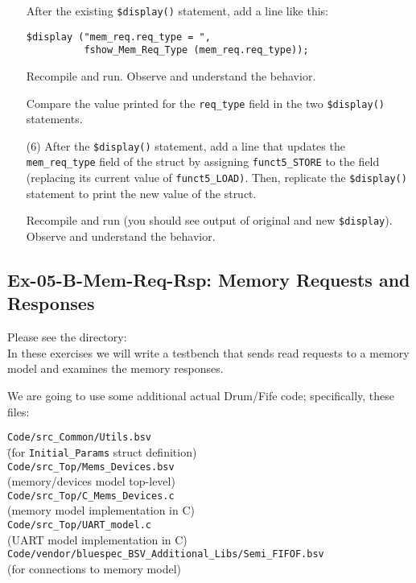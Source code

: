 \begin{itemize}
    After the existing \verb|$display()| statement, add a line like this:

    \hmm \verb|$display ("mem_req.req_type = ",| \\
    \hmm \verb|          fshow_Mem_Req_Type (mem_req.req_type));|

    Recompile and run. Observe and understand the behavior.

    Compare the value printed for the \verb|req_type| field in the two
    \verb|$display()| statements.

\item[(6)] After the \verb|$display()| statement, add a line that
    updates the \verb|mem_req_type| field of the struct by assigning
    \verb|funct5_STORE| to the field (replacing its current value of
    \verb|funct5_LOAD)|. Then, replicate the \verb|$display()|
    statement to print the new value of the struct.

    Recompile and run (you should see output of original and new
    \verb|$display|).  Observe and understand the behavior.

\end{itemize}


\subsection*{Ex-05-B-Mem-Req-Rsp: Memory Requests and Responses}

\label{Ex-05-B-Mem-Req-Rsp}

Please see the directory:  \\
In these exercises we will write a testbench that sends read requests
to a memory model and examines the memory responses.

We are going to use some additional actual Drum/Fife code;
specifically, these files:

\begin{tabbing}
\hmmmm \= \verb|Code/src_Common/Utils.bsv| \\
       \> \hmmmm \= (for \verb|Initial_Params| struct definition) \\
       \> \verb|Code/src_Top/Mems_Devices.bsv| \\
       \>        \> (memory/devices model top-level) \\
       \> \verb|Code/src_Top/C_Mems_Devices.c| \\
       \>        \> (memory model implementation in C) \\
       \> \verb|Code/src_Top/UART_model.c| \\
       \>        \> (UART model implementation in C) \\
       \> \verb|Code/vendor/bluespec_BSV_Additional_Libs/Semi_FIFOF.bsv| \\
       \>        \> (for connections to memory model)
\end{tabbing}

